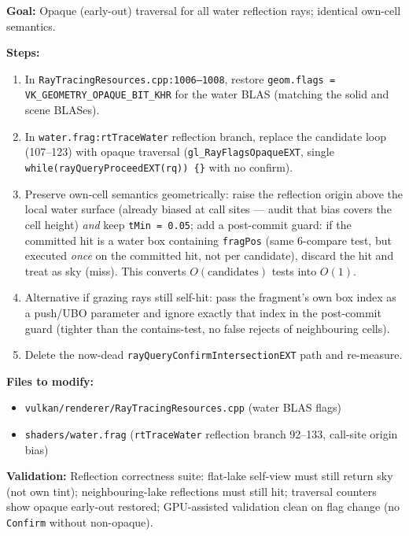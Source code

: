 \documentclass[11pt,a4paper]{article}
\begin{document}
\begin{tcolorbox}[promptbox={Prompt: Restore Opaque Water Traversal; Reject Own Cell Without Any-Hit}]
\textbf{Goal:} Opaque (early-out) traversal for all water reflection rays; identical own-cell semantics.

\textbf{Steps:}
\begin{enumerate}
    \item In \texttt{RayTracingResources.cpp:1006--1008}, restore \texttt{geom.flags = VK\_GEOMETRY\_OPAQUE\_BIT\_KHR} for the water BLAS (matching the solid and scene BLASes).
    \item In \texttt{water.frag:rtTraceWater} reflection branch, replace the candidate loop (107--123) with opaque traversal (\texttt{gl\_RayFlagsOpaqueEXT}, single \texttt{while(rayQueryProceedEXT(rq)) \{\}} with no confirm).
    \item Preserve own-cell semantics geometrically: raise the reflection origin above the local water surface (already biased at call sites --- audit that bias covers the cell height) \textit{and} keep \texttt{tMin = 0.05}; add a post-commit guard: if the committed hit is a water box containing \texttt{fragPos} (same 6-compare test, but executed \textit{once} on the committed hit, not per candidate), discard the hit and treat as sky (miss). This converts $O(\mathrm{candidates})$ tests into $O(1)$.
    \item Alternative if grazing rays still self-hit: pass the fragment's own box index as a push/UBO parameter and ignore exactly that index in the post-commit guard (tighter than the contains-test, no false rejects of neighbouring cells).
    \item Delete the now-dead \texttt{rayQueryConfirmIntersectionEXT} path and re-measure.
\end{enumerate}

\textbf{Files to modify:}
\begin{itemize}
    \item \texttt{vulkan/renderer/RayTracingResources.cpp} (water BLAS flags)
    \item \texttt{shaders/water.frag} (\texttt{rtTraceWater} reflection branch 92--133, call-site origin bias)
\end{itemize}

\textbf{Validation:} Reflection correctness suite: flat-lake self-view must still return sky (not own tint); neighbouring-lake reflections must still hit; traversal counters show opaque early-out restored; GPU-assisted validation clean on flag change (no \texttt{Confirm} without non-opaque).
\end{tcolorbox}
\end{document}
